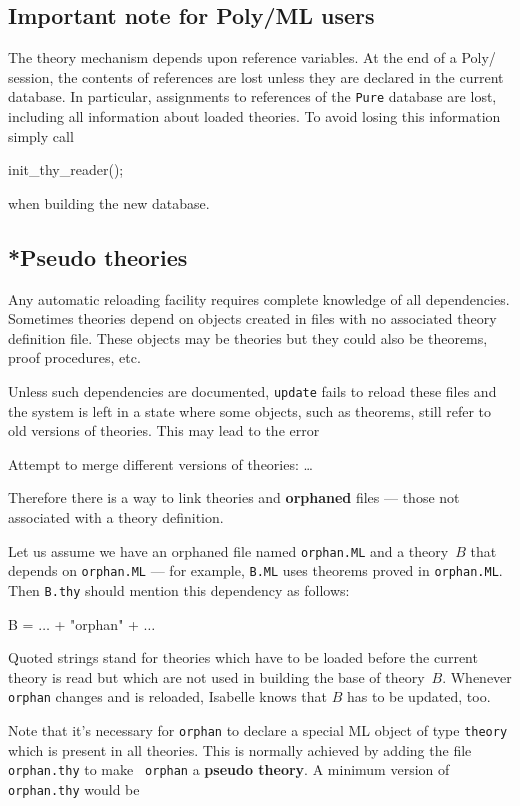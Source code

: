 \goodbreak
\subsection{Important note for Poly/ML users}
The theory mechanism depends upon reference variables.  At the end of a
Poly/\ML{} session, the contents of references are lost unless they are
declared in the current database.  In particular, assignments to references
of the {\tt Pure} database are lost, including all information about loaded
theories. To avoid losing this information simply call
\begin{ttbox}
init_thy_reader();
\end{ttbox}
when building the new database.


\subsection{*Pseudo theories}\label{sec:pseudo-theories}
%
Any automatic reloading facility requires complete knowledge of all
dependencies.  Sometimes theories depend on objects created in \ML{} files
with no associated theory definition file.  These objects may be theories but
they could also be theorems, proof procedures, etc.

Unless such dependencies are documented, {\tt update} fails to reload these
\ML{} files and the system is left in a state where some objects, such as
theorems, still refer to old versions of theories.  This may lead to the
error
\begin{ttbox}
Attempt to merge different versions of theories: \dots
\end{ttbox}
Therefore there is a way to link theories and {\bf orphaned} \ML{} files ---
those not associated with a theory definition.

Let us assume we have an orphaned \ML{} file named {\tt orphan.ML} and a
theory~$B$ that depends on {\tt orphan.ML} --- for example, {\tt B.ML} uses
theorems proved in {\tt orphan.ML}.  Then {\tt B.thy} should
mention this dependency as follows:
\begin{ttbox}
B = \(\ldots\) + "orphan" + \(\ldots\)
\end{ttbox}
Quoted strings stand for theories which have to be loaded before the
current theory is read but which are not used in building the base of
theory~$B$. Whenever {\tt orphan} changes and is reloaded, Isabelle
knows that $B$ has to be updated, too.

Note that it's necessary for {\tt orphan} to declare a special ML
object of type {\tt theory} which is present in all theories. This is
normally achieved by adding the file {\tt orphan.thy} to make {\tt
orphan} a {\bf pseudo theory}. A minimum version of {\tt orphan.thy}
would be

